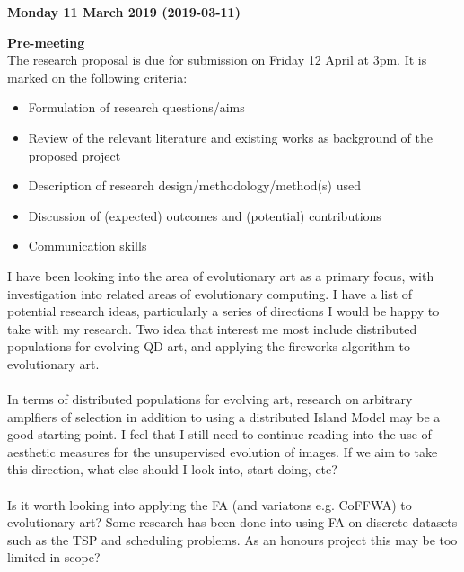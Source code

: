 \documentclass[10pt,a4paper]{article}
\begin{document}
\begin{center} \textbf{Monday 11 March 2019 (2019-03-11)} \end{center} 
\textbf{Pre-meeting}
\\
The research proposal is due for submission on Friday 12 April at 3pm.
It is marked on the following criteria:
\begin{itemize}
	\item Formulation of research questions/aims
	\item Review of the relevant literature and existing works as background of the proposed project
	\item Description of research design/methodology/method(s) used
	\item Discussion of (expected) outcomes and (potential) contributions
	\item Communication skills
\end{itemize}
I have been looking into the area of evolutionary art as a primary focus, with investigation into related areas of evolutionary computing.
I have a list of potential research ideas, particularly a series of directions I would be happy to take with my research.
Two idea that interest me most include distributed populations for evolving QD art, and applying the fireworks algorithm to evolutionary art.
\\\\
In terms of distributed populations for evolving art, research on arbitrary amplfiers of selection \cite{graph-amplifiers} in addition to using a distributed Island Model \cite{distributed-evolutionary-art} may be a good starting point.
I feel that I still need to continue reading into the use of aesthetic measures for the unsupervised evolution of images.
If we aim to take this direction, what else should I look into, start doing, etc?
\\\\
Is it worth looking into applying the FA (and variatons e.g. CoFFWA) to evolutionary art?
Some research has been done into using FA on discrete datasets such as the TSP and scheduling problems.
As an honours project this may be too limited in scope?


\pagebreak



\end{document}
